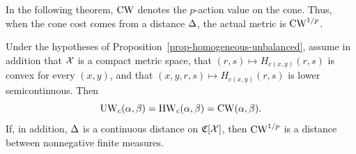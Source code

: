 In the following theorem, \(\operatorname{CW}\) denotes the \(p\)-action value on the cone. Thus, when the cone cost comes from a distance \(\Delta\), the actual metric is \(\operatorname{CW}^{1/p}\).

\begin{thm}\label{thm-cone-unbalanced-ot}
	Under the hypotheses of Proposition~\ref{prop-homogeneous-unbalanced}, assume in addition that $\mathcal{X}$ is a compact metric space, that $(r,s)\mapsto H_{c(x,y)}(r,s)$ is convex for every $(x,y)$, and that $(x,y,r,s)\mapsto H_{c(x,y)}(r,s)$ is lower semicontinuous. Then
	\[
		\operatorname{UW}_c(\alpha,\beta)=\operatorname{HW}_c(\alpha,\beta)=\operatorname{CW}(\alpha,\beta).
	\]
	If, in addition, $\Delta$ is a continuous distance on $\mathfrak C[\mathcal{X}]$, then $\operatorname{CW}^{1/p}$ is a distance between nonnegative finite measures.
\end{thm}

